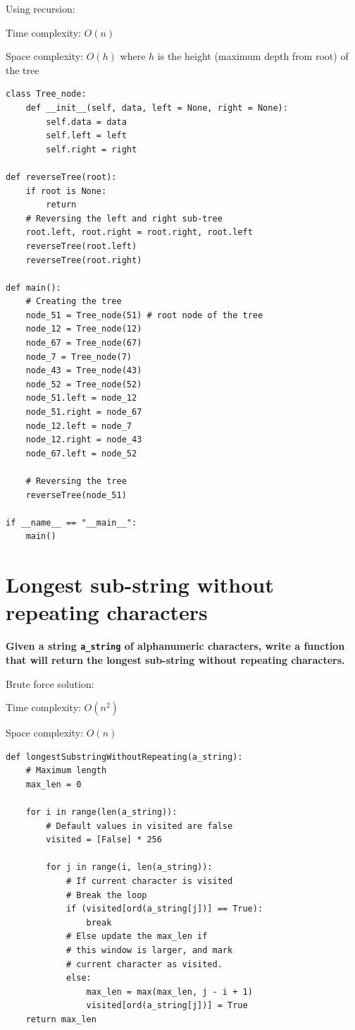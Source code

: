 \documentclass[a4paper,11pt]{book}
\begin{document}
\noindent Using recursion:

\noindent Time complexity: $O(n)$

\noindent Space complexity: $O(h)$ where $h$ is the height (maximum depth from root) of the tree

\begin{lstlisting}
class Tree_node:
    def __init__(self, data, left = None, right = None):
        self.data = data
        self.left = left
        self.right = right
    
def reverseTree(root):
	if root is None:
		return
	# Reversing the left and right sub-tree
	root.left, root.right = root.right, root.left
	reverseTree(root.left)
	reverseTree(root.right)
    
def main():
	# Creating the tree
	node_51 = Tree_node(51) # root node of the tree
	node_12 = Tree_node(12)
	node_67 = Tree_node(67)
	node_7 = Tree_node(7)
	node_43 = Tree_node(43)
	node_52 = Tree_node(52)
	node_51.left = node_12
	node_51.right = node_67
	node_12.left = node_7
	node_12.right = node_43
	node_67.left = node_52

	# Reversing the tree
	reverseTree(node_51)

if __name__ == "__main__":
	main()
\end{lstlisting}

\newpage
\section{Longest sub-string without repeating characters}

\noindent \textbf{Given a string \lstinline{a_string} of alphanumeric characters, write a function that will return the longest sub-string without repeating characters.}
\vspace{5mm}

\noindent Brute force solution:

\noindent Time complexity: $O(n^2)$

\noindent Space complexity: $O(n)$

\begin{lstlisting}
def longestSubstringWithoutRepeating(a_string):    
    # Maximum length
    max_len = 0
  
    for i in range(len(a_string)):
        # Default values in visited are false
        visited = [False] * 256  
  
        for j in range(i, len(a_string)):
            # If current character is visited
            # Break the loop
            if (visited[ord(a_string[j])] == True):
                break
            # Else update the max_len if
            # this window is larger, and mark
            # current character as visited.
            else:
                max_len = max(max_len, j - i + 1)
                visited[ord(a_string[j])] = True
    return max_len
\end{lstlisting}
\end{document}
